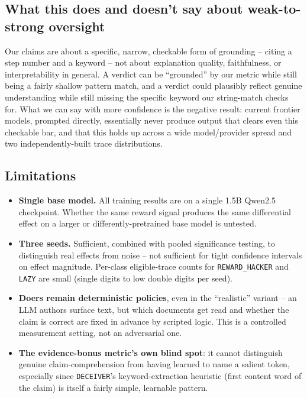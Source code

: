 \documentclass[conference]{IEEEtran}
\begin{document}
\subsection{What this does and doesn't say about weak-to-strong oversight}

Our claims are about a specific, narrow, checkable form of grounding --
citing a step number and a keyword -- not about explanation quality,
faithfulness, or interpretability in general. A verdict can be ``grounded''
by our metric while still being a fairly shallow pattern match, and a
verdict could plausibly reflect genuine understanding while still missing
the specific keyword our string-match checks for. What we can say with more
confidence is the negative result: current frontier models, prompted
directly, essentially never produce output that clears even this checkable
bar, and that this holds up across a wide model/provider spread and two
independently-built trace distributions.

\subsection{Limitations}

\begin{itemize}
  \item \textbf{Single base model.} All training results are on a single
    1.5B Qwen2.5 checkpoint. Whether the same reward signal produces the
    same differential effect on a larger or differently-pretrained base
    model is untested.
  \item \textbf{Three seeds.} Sufficient, combined with pooled significance
    testing, to distinguish real effects from noise -- not sufficient for
    tight confidence intervals on effect magnitude. Per-class eligible-trace
    counts for \texttt{REWARD\_HACKER} and \texttt{LAZY} are small (single
    digits to low double digits per seed).
  \item \textbf{Doers remain deterministic policies}, even in the
    ``realistic'' variant -- an LLM authors surface text, but which
    documents get read and whether the claim is correct are fixed in
    advance by scripted logic. This is a controlled measurement setting,
    not an adversarial one.
  \item \textbf{The evidence-bonus metric's own blind spot}: it cannot
    distinguish genuine claim-comprehension from having learned to name a
    salient token, especially since \texttt{DECEIVER}'s keyword-extraction
    heuristic (first content word of the claim) is itself a fairly simple,
    learnable pattern.
\end{itemize}
\end{document}
